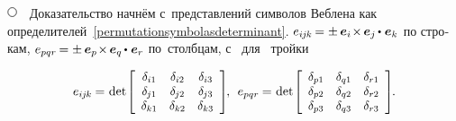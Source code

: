 \begin{otherlanguage}{russian}
\noindent
${ \tikz[baseline=-1ex] \draw [line width=.5pt, color=black, fill=white] (0, 0) circle (.8ex);
\hspace{.6em} }$
Доказательство начнём с~представлений символов Веблена как определителей~\eqref{permutationsymbolasdeterminant}.
${ e_{i\hspace{-0.1ex}j\hspace{-0.1ex}k} \hspace{-0.2ex}
= \pm \hspace{.4ex}
\bm{e}_i \hspace{-0.36ex} \times \hspace{-0.2ex} \bm{e}_j \hspace{-0.15ex} \dotp \hspace{.1ex} \bm{e}_k }$ по строкам,
${ e_{pqr} \hspace{-0.2ex}
= \pm \hspace{.4ex}
\bm{e}_p \hspace{-0.36ex} \times \hspace{-0.2ex} \bm{e}_q \hspace{-0.15ex} \dotp \hspace{.1ex} \bm{e}_r }$ по~столбцам,
с~\inquotes{$-$} для~ тройки

\nopagebreak\vspace{-0.25em}\begin{equation*}
e_{i\hspace{-0.1ex}j\hspace{-0.1ex}k} \hspace{-0.1ex} = \hspace{.1ex}
\operatorname{det}\hspace{-0.25ex} \scalebox{0.96}[0.96]{$\left[\begin{array}{ccc}
\delta_{i1} & \delta_{i2} & \delta_{i3} \\
\delta_{\hspace{-0.1ex}j1} & \delta_{\hspace{-0.1ex}j2} & \delta_{\hspace{-0.1ex}j3} \\
\delta_{k1} & \delta_{k2} & \delta_{k3}
\end{array}\right]$} \hspace{-0.25ex}, \:\:
e_{pqr} \hspace{-0.1ex} = \hspace{.1ex}
\operatorname{det}\hspace{-0.25ex} \scalebox{0.96}[0.96]{$\left[\begin{array}{ccc}
\delta_{p1} & \delta_{q1} & \delta_{r1} \\
\delta_{p2} & \delta_{q2} & \delta_{r2} \\
\delta_{p3} & \delta_{q3} & \delta_{r3}
\end{array}\right]$}
\hspace{-0.2ex} .
\end{equation*}


\end{otherlanguage}
